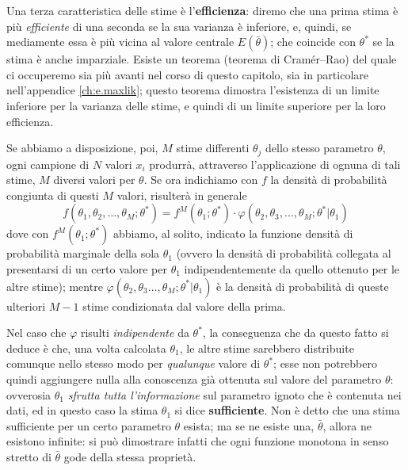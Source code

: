 Una terza caratteristica delle stime \`e
l'\textbf{efficienza}: diremo che una prima stima \`e pi\`u
\emph{efficiente} di una seconda se la sua varianza \`e
inferiore, e, quindi, se mediamente essa \`e pi\`u vicina al
valore centrale $E( \bar \theta)$; che coincide con
$\theta^*$ se la stima \`e anche imparziale.  Esiste un
teorema (teorema di Cram\'er--Rao)%
del quale ci occuperemo sia pi\`u avanti nel corso di questo
capitolo, sia in particolare nell'appendice
\ref{ch:e.maxlik}; questo teorema dimostra l'esistenza di un
limite inferiore per la varianza delle stime, e quindi di un
limite superiore per la loro efficienza.

Se abbiamo a disposizione, poi, $M$ stime differenti
$\theta_j$ dello stesso parametro $\theta$, ogni campione di
$N$ valori $x_i$ produrr\`a, attraverso l'applicazione di
ognuna di tali stime, $M$ diversi valori per $\theta$.  Se
ora indichiamo con $f$ la densit\`a di probabilit\`a
congiunta di questi $M$ valori, risulter\`a in generale
\begin{equation*}
  f ( \theta_1, \theta_2,\ldots,\theta_M; \theta^* ) = f^M (
    \theta_1; \theta^* ) \cdot \varphi( \theta_2,
    \theta_3,\ldots,\theta_M; \theta^* | \theta_1 )
\end{equation*}
dove con $f^M ( \theta_1; \theta^* )$ abbiamo, al solito,
indicato la funzione densit\`a di probabilit\`a marginale
della sola $\theta_1$ (ovvero la densit\`a di probabilit\`a
collegata al presentarsi di un certo valore per $\theta_1$
indipendentemente da quello ottenuto per le altre stime);
mentre $\varphi( \theta_2, \theta_3\ldots,\theta_M; \theta^*
| \theta_1 )$ \`e la densit\`a di probabilit\`a di queste
ulteriori $M-1$ stime condizionata dal valore della prima.

%
Nel caso che $\varphi$ risulti \emph{indipendente} da
$\theta^*$, la conseguenza che da questo fatto si deduce \`e
che, una volta calcolata $\theta_1$, le altre stime
sarebbero distribuite comunque nello stesso modo per
\emph{qualunque} valore di $\theta^*$; esse non potrebbero
quindi aggiungere nulla alla conoscenza gi\`a ottenuta sul
valore del parametro $\theta$: ovverosia $\theta_1$
\emph{sfrutta tutta l'informazione} sul parametro ignoto che
\`e contenuta nei dati, ed in questo caso la stima
$\theta_1$ si dice \textbf{sufficiente}.  Non \`e detto che
una stima sufficiente per un certo parametro $\theta$
esista; ma se ne esiste una, $\bar \theta$, allora ne
esistono infinite: si pu\`o dimostrare infatti che ogni
funzione monotona in senso stretto di $\bar \theta$ gode
della stessa propriet\`a.%
%

